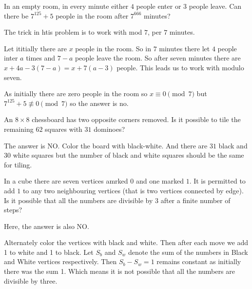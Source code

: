 \begin{example}
In an empty room, in every minute either $4$ people enter or $3$ people leave. Can there be $7^{125}+5$ people in the room after $7^{666}$ minutes?
\end{example}

\begin{soln}
The trick in htis problem is to work with mod $7$, per $7$ minutes.

Let ititially there are $x$ people in the room. So in $7$ minutes there let $4$ people inter $a$ times and $7-a$ people leave the room. So after seven minutes there are $x+4a -3(7-a)=x+7(a-3)$ people. This leads us to work with modulo seven.

As initially there are zero people in the room so $x \equiv 0 \pmod 7 $ but $7^{125}+5 \not\equiv 0 \pmod 7$ so the answer is no.
\end{soln}



\begin{example}
An $8\times 8$ chessboard has two opposite corners removed. Is it possible to tile the remaining $62$ squares with $31$ dominoes?
\end{example}

\begin{soln}
The answer is NO. Color the board with black-white. And there are $31$ black and $30$ white squares but the number of black and white squares should be the same for tiling.
\end{soln}



\begin{example}
In a cube there are seven vertices amrked $0$ and one marked $1$. It is permitted to add $1$ to any two neighbouring vertices (that is two vertices connected by edge). Is it possible that all the numbers are divisible by $3$ after a finite number of steps?
\end{example}

\begin{soln}
Here, the answer is also NO.

Alternately color the vertices with black and white. Then after each move we add 1 to white and 1 to black. Let $S_b$ and $S_w$ denote the sum of the numbers in Black and White vertices respectively. Then $S_b - S_w =1 $ remains constant as initially there was the sum 1. Which means it is not possible that all the numbers are divisible by three.
\end{soln}




